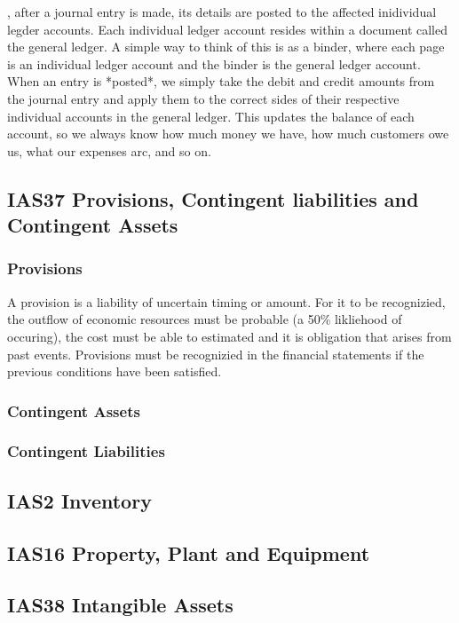 {   , after a journal entry is made, its details are posted to the affected inidividual legder accounts. Each individual ledger account resides within a document called the general ledger. A simple way to think of this is as a binder, where each page is an individual ledger account and the binder is the general ledger account. When an entry is *posted*, we simply take the debit and credit amounts from the journal entry and apply them to the correct sides of their respective individual accounts in the general ledger. This updates the balance of each account, so we always know how much money we have, how much customers owe us, what our expenses arc, and so on.

  


\newpage
{}


\subsection{IAS37 Provisions, Contingent liabilities and Contingent Assets}

\subsubsection{Provisions}

A provision is a liability of uncertain timing or amount. For it to be recognizied, the outflow of economic resources must be probable (a 50\% likliehood of occuring), the cost must be able to estimated and it is obligation that arises from past 
events. Provisions must be recognizied in the financial statements if the previous conditions have been satisfied. 
 

\subsubsection{Contingent Assets}


\subsubsection{Contingent Liabilities}
\subsection{IAS2 Inventory} 


\subsection{IAS16 Property, Plant and Equipment}


\subsection{IAS38 Intangible Assets}
}
